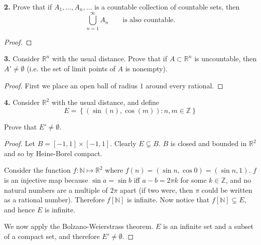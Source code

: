 \documentclass{article}
\newcommand{\R}{\mathbb{R}}
\newcommand{\Z}{\mathbb{Z}}
\newcommand{\N}{\mathbb{N}}
\newcommand{\set}[1]{\left\{ #1 \right\}}
\newcommand{\paren}[1]{\left( #1 \right)}
\begin{document}
\newpage %


\textbf{2. }
Prove that if $A_1, \dots, A_n, \dots$ is a countable collection of countable sets, then
$$\bigcup_{n = 1}^{\infty} A_n \qquad \text{is also countable.}$$

\begin{proof}
    
\end{proof}


\newpage %


\textbf{3. }
Consider $\R^n$ with the usual distance. Prove that if $A \subset
\R^n$ is uncountable, then $A' \ne \emptyset$ (i.e. the set of limit points of $A$ is nonempty).

\begin{proof}

    First we place an open ball of radius $1$ around every rational. 

\end{proof}


\newpage %


\textbf{4. }
Consider $\R^2$ with the usual distance, and define
$$E = \set{\paren{\sin(n), \cos(m)} : n, m \in \Z}$$

Prove that $E' \ne \emptyset$.

\begin{proof}
    Let $B = [-1, 1] \times [-1, 1]$. Clearly $E \subsetneq B$. $B$ is closed and bounded in $\R^2$ and so by Heine-Borel compact.

    Consider the function $f : \N \mapsto \R^2$ where $f(n) = \paren{\sin n, \cos 0} = \paren{\sin n, 1}$. $f$ is an injective map because $\sin a = \sin b$ iff $a - b = 2 \pi k$ for some $k \in \Z$, and no natural numbers are a multiple of $2\pi$ apart (if two were, then $\pi$ could be written as a rational number). Therefore $f[\N]$ is infinite. Now notice that $f[\N] \subsetneq E$, and hence $E$ is infinite.

    We now apply the Bolzano-Weierstrass theorem. $E$ is an infinite set and a subset of a compact set, and therefore $E' \ne \emptyset$.    
\end{proof}


\newpage %
\end{document}
